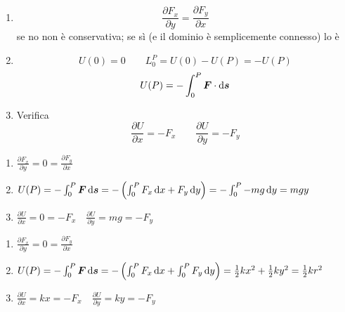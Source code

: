 \begin{enumerate}
  \item
        \[\frac {\partial F_x}{\partial y}=\frac {\partial
            F_y}{\partial x}
        \]
        se no non è conservativa; se sì (e il dominio è semplicemente connesso) lo è

        \item\[U(0)=0 \qquad L_0^P=U(0)-U(P)=-U(P)\]
        \[U(P)=-\int_0^P \boldsymbol{F}\cdot\mathrm{d} \boldsymbol{s}\]

  \item Verifica
        \[\frac {\partial U}{\partial x}=-F_x \qquad \frac{\partial U}{\partial y}=-F_y\]
\end{enumerate}
\begin{Es}[Forza peso $F_x=0 \quad F_y=-mg$]
  \begin{enumerate}
    \item $\frac {\partial F_x}{\partial y}=0=\frac {\partial
              F_y}{\partial x}$

    \item $U(P)=-\int_0^P  \boldsymbol{F}\, \mathrm{d} \boldsymbol{s}=-\left(\int_0^P F_x\, \mathrm{d} x+F_y\, \mathrm{d}
            y\right)=-\int_0^P -mg \, \mathrm{d} y = mgy$

    \item $\frac {\partial U}{\partial x}=0=-F_x\quad \frac {\partial
              U}{\partial y}=mg=-F_y$
  \end{enumerate}
\end{Es}
\begin{Es}[Forza elastica $F_x=-kx \quad F_y=-ky$]
  \begin{enumerate}
    \item$\frac {\partial F_x}{\partial y}=0=\frac {\partial
        F_y}{\partial x}$

    \item$U(P)=-\int_0^P \boldsymbol{F}\, \mathrm{d} \boldsymbol{s}=-\left(\int_0^P F_x\, \mathrm{d} x+\int_0^P
      F_y\, \mathrm{d} y \right)=\frac
      {1}{2}kx^2+\frac{1}{2}ky^2=\frac{1}{2}kr^2$

    \item$\frac{\partial U}{\partial x}=kx=-F_x \quad \frac{\partial
        U}{\partial y}=ky=-F_y$
  \end{enumerate}
\end{Es}
